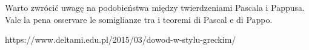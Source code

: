 Warto zwrócić uwagę na podobieństwa między twierdzeniami Pascala i Pappusa. %
Vale la pena osservare le somiglianze tra i teoremi di Pascal e di Pappo. %



https://www.deltami.edu.pl/2015/03/dowod-w-stylu-greckim/

%